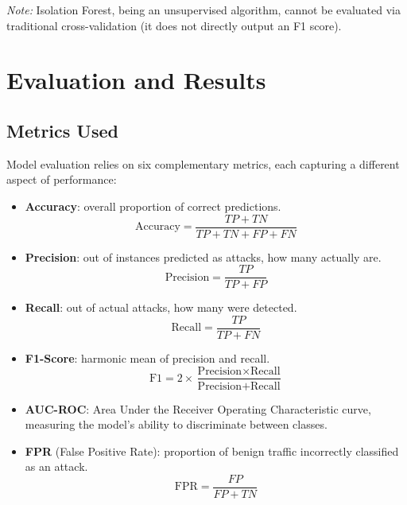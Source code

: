 \noindent \textit{Note:} Isolation Forest, being an unsupervised algorithm, cannot be evaluated via traditional cross-validation (it does not directly output an F1 score).

\section{Evaluation and Results}

\subsection{Metrics Used}

Model evaluation relies on six complementary metrics, each capturing a different aspect of performance:

\begin{itemize}
    \item \textbf{Accuracy}: overall proportion of correct predictions.
    \begin{equation}
        \text{Accuracy} = \frac{TP + TN}{TP + TN + FP + FN}
    \end{equation}

    \item \textbf{Precision}: out of instances predicted as attacks, how many actually are.
    \begin{equation}
        \text{Precision} = \frac{TP}{TP + FP}
    \end{equation}

    \item \textbf{Recall}: out of actual attacks, how many were detected.
    \begin{equation}
        \text{Recall} = \frac{TP}{TP + FN}
    \end{equation}

    \item \textbf{F1-Score}: harmonic mean of precision and recall.
    \begin{equation}
        \text{F1} = 2 \times \frac{\text{Precision} \times \text{Recall}}{\text{Precision} + \text{Recall}}
    \end{equation}

    \item \textbf{AUC-ROC}: Area Under the Receiver Operating Characteristic curve, measuring the model's ability to discriminate between classes.

    \item \textbf{FPR} (False Positive Rate): proportion of benign traffic incorrectly classified as an attack.
    \begin{equation}
        \text{FPR} = \frac{FP}{FP + TN}
    \end{equation}
\end{itemize}

